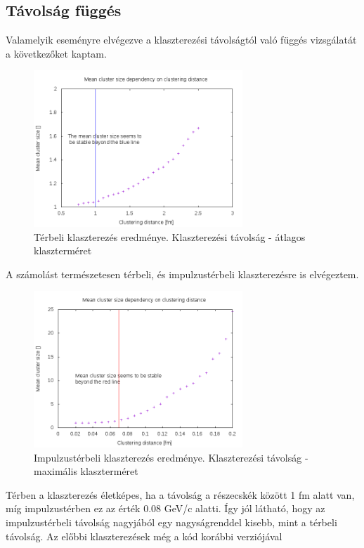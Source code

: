 \documentclass[a4paper,12pt]{article}
\begin{document}
\subsection{ Távolság függés}
\par Valamelyik eseményre elvégezve a klaszterezési távolságtól való függés vizsgálatát a következőket kaptam.
\begin{figure}[H]
	\centering
	\includegraphics[width=0.7\textwidth]{dist-mean.png}
	\caption{ Térbeli klaszterezés eredménye. Klaszterezési távolság - átlagos klaszterméret }
\end{figure}
\par A számolást természetesen térbeli, és impulzustérbeli klaszterezésre is elvégeztem.
\begin{figure}[H]
	\centering
	\includegraphics[width=0.7\textwidth]{momdist-mean.png}
	\caption{ Impulzustérbeli klaszterezés eredménye. Klaszterezési távolság - maximális klaszterméret }
\end{figure}
\par Térben a klaszterezés életképes, ha a távolság a részecskék között 1 fm alatt van, míg impulzustérben ez az érték 0.08 GeV/c alatti. Így jól látható,
hogy az impulzustérbeli távolság nagyjából egy nagyságrenddel kisebb, mint a térbeli távolság. Az előbbi klaszterezések még a kód korábbi verziójával
\end{document}
